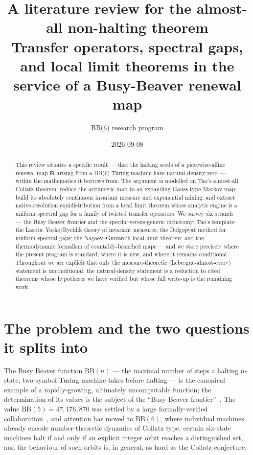 \documentclass[11pt]{article}
\title{\bfseries A literature review for the almost-all non-halting theorem\\[3pt]
\large Transfer operators, spectral gaps, and local limit theorems in the
service of a Busy-Beaver renewal map}
\author{BB(6) research program}
\date{2026-09-08}
\newcommand{\R}{\mathbf{R}}
\begin{document}
\maketitle

\begin{abstract}
This review situates a specific result --- that the halting seeds of a
piecewise-affine renewal map $\R$ arising from a \textrm{BB(6)} Turing machine
have natural density zero --- within the mathematics it borrows from. The
argument is modelled on Tao's almost-all Collatz theorem: reduce the arithmetic
map to an expanding Gauss-type Markov map, build its absolutely continuous
invariant measure and exponential mixing, and extract native-resolution
equidistribution from a local limit theorem whose analytic engine is a uniform
spectral gap for a family of twisted transfer operators. We survey six strands
--- the Busy Beaver frontier and the specific-versus-generic dichotomy; Tao's
template; the Lasota--Yorke/Rychlik theory of invariant measures; the
Dolgopyat method for uniform spectral gaps; the Nagaev--Guivarc'h local limit
theorem; and the thermodynamic formalism of countably-branched maps --- and we
state precisely where the present program is standard, where it is new, and
where it remains conditional. Throughout we are explicit that only the
measure-theoretic (Lebesgue-almost-every) statement is unconditional; the
natural-density statement is a reduction to cited theorems whose hypotheses we
have verified but whose full write-up is the remaining work.
\end{abstract}

\tableofcontents

\section{The problem and the two questions it splits into}
\label{sec:problem}

The Busy Beaver function $\mathrm{BB}(n)$ --- the maximal number of steps a
halting $n$-state, two-symbol Turing machine takes before halting --- is the
canonical example of a rapidly-growing, ultimately uncomputable function; the
determination of its values is the subject of the ``Busy Beaver
frontier''~\cite{Aaronson2020}. The value $\mathrm{BB}(5)=47{,}176{,}870$ was
settled by a large formally-verified collaboration~\cite{bbchallenge2024}, and
attention has moved to $\mathrm{BB}(6)$, where individual machines already
encode number-theoretic dynamics of Collatz type: certain six-state machines
halt if and only if an explicit integer orbit reaches a distinguished set, and
the behaviour of such orbits is, in general, as hard as the Collatz conjecture.
\end{document}
